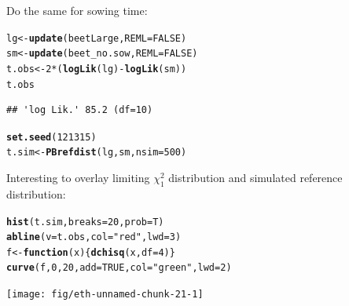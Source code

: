 \documentclass[compress]{beamer}\usepackage[]{graphicx}\usepackage[]{color}
\makeatletter
\newcommand{\hlnum}[1]{\textcolor[rgb]{0.686,0.059,0.569}{#1}}%
\newcommand{\hlstr}[1]{\textcolor[rgb]{0.192,0.494,0.8}{#1}}%
\newcommand{\hlopt}[1]{\textcolor[rgb]{0,0,0}{#1}}%
\newcommand{\hlstd}[1]{\textcolor[rgb]{0.345,0.345,0.345}{#1}}%
\newcommand{\hlkwa}[1]{\textcolor[rgb]{0.161,0.373,0.58}{\textbf{#1}}}%
\newcommand{\hlkwb}[1]{\textcolor[rgb]{0.69,0.353,0.396}{#1}}%
\newcommand{\hlkwc}[1]{\textcolor[rgb]{0.333,0.667,0.333}{#1}}%
\newcommand{\hlkwd}[1]{\textcolor[rgb]{0.737,0.353,0.396}{\textbf{#1}}}%
\newenvironment{kframe}{%
 \def\at@end@of@kframe{}%
 \ifinner\ifhmode%
  \def\at@end@of@kframe{\end{minipage}}%
  \begin{minipage}{\columnwidth}%
 \fi\fi%
 \def\FrameCommand##1{\hskip\@totalleftmargin \hskip-\fboxsep
 \colorbox{shadecolor}{##1}\hskip-\fboxsep
     \hskip-\linewidth \hskip-\@totalleftmargin \hskip\columnwidth}%
 \MakeFramed {\advance\hsize-\width
   \@totalleftmargin\z@ \linewidth\hsize
   \@setminipage}}%
 {\par\unskip\endMakeFramed%
 \at@end@of@kframe}
\newenvironment{knitrout}{}{} %
\newenvironment{sframe}
{\begin{frame} [containsverbatim] }
  {\end{frame}}
\makeatother
\begin{document}
\begin{sframe}
Do the same for sowing time:

\begin{knitrout}\tiny
{}\color{fgcolor}\begin{kframe}
\begin{alltt}
\hlstd{lg} \hlkwb{<-} \hlkwd{update}\hlstd{(beetLarge,} \hlkwc{REML}\hlstd{=}\hlnum{FALSE}\hlstd{)}
\hlstd{sm} \hlkwb{<-} \hlkwd{update}\hlstd{(beet_no.sow,} \hlkwc{REML}\hlstd{=}\hlnum{FALSE}\hlstd{)}
\hlstd{t.obs} \hlkwb{<-} \hlnum{2}\hlopt{*}\hlstd{(}\hlkwd{logLik}\hlstd{(lg)}\hlopt{-}\hlkwd{logLik}\hlstd{(sm))}
\hlstd{t.obs}
\end{alltt}
\begin{verbatim}
## 'log Lik.' 85.2 (df=10)
\end{verbatim}
\end{kframe}
\end{knitrout}


\begin{knitrout}\tiny
{}\color{fgcolor}\begin{kframe}
\begin{alltt}
\hlkwd{set.seed}\hlstd{(}\hlnum{121315}\hlstd{)}
\hlstd{t.sim} \hlkwb{<-} \hlkwd{PBrefdist}\hlstd{(lg, sm,} \hlkwc{nsim}\hlstd{=}\hlnum{500}\hlstd{)}
\end{alltt}
\end{kframe}
\end{knitrout}

  
\end{sframe}

\begin{sframe}

  Interesting to overlay limiting $\chi^2_1$
  distribution and simulated reference distribution:
  
\begin{knitrout}\tiny
{}\color{fgcolor}\begin{kframe}
\begin{alltt}
\hlkwd{hist}\hlstd{(t.sim,} \hlkwc{breaks}\hlstd{=}\hlnum{20}\hlstd{,} \hlkwc{prob}\hlstd{=T)}
\hlkwd{abline}\hlstd{(}\hlkwc{v}\hlstd{=t.obs,} \hlkwc{col}\hlstd{=}\hlstr{"red"}\hlstd{,} \hlkwc{lwd}\hlstd{=}\hlnum{3}\hlstd{)}
\hlstd{f} \hlkwb{<-} \hlkwa{function}\hlstd{(}\hlkwc{x}\hlstd{)\{}\hlkwd{dchisq}\hlstd{(x,} \hlkwc{df}\hlstd{=}\hlnum{4}\hlstd{)\}}
\hlkwd{curve}\hlstd{(f,} \hlnum{0}\hlstd{,} \hlnum{20}\hlstd{,} \hlkwc{add}\hlstd{=}\hlnum{TRUE}\hlstd{,} \hlkwc{col}\hlstd{=}\hlstr{"green"}\hlstd{,} \hlkwc{lwd}\hlstd{=}\hlnum{2}\hlstd{)}
\end{alltt}
\end{kframe}
\texttt{[image: fig/eth-unnamed-chunk-21-1]} 

\end{knitrout}
  
\end{sframe}
\end{document}
